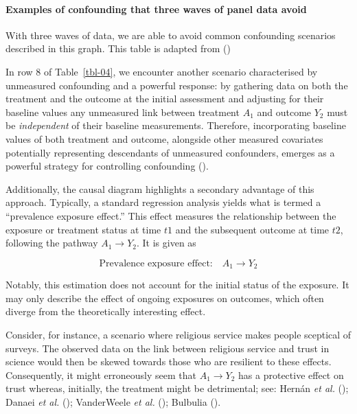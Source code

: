 \documentclass[
  singlecolumn]{article}
\let\oldparagraph\paragraph
\renewcommand{\paragraph}[1]{\oldparagraph{#1}\mbox{}}
\begin{document}
\paragraph{Examples of confounding that three waves of panel data
avoid}\label{examples-of-confounding-that-three-waves-of-panel-data-avoid}

\begin{table}

\caption{\label{tbl-04}With three waves of data, we are able to avoid
common confounding scenarios described in this graph. This table is
adapted from ()}

\centering{

\terminologychronologicalhygeine

}

\end{table}%

In row 8 of Table~\ref{tbl-04}, we encounter another scenario
characterised by unmeasured confounding and a powerful response: by
gathering data on both the treatment and the outcome at the initial
assessment and adjusting for their baseline values any unmeasured link
between treatment \(A_1\) and outcome \(Y_2\) must be \emph{independent}
of their baseline measurements. Therefore, incorporating baseline values
of both treatment and outcome, alongside other measured covariates
potentially representing descendants of unmeasured confounders, emerges
as a powerful strategy for controlling confounding
().

Additionally, the causal diagram highlights a secondary advantage of
this approach. Typically, a standard regression analysis yields what is
termed a ``prevalence exposure effect.'' This effect measures the
relationship between the exposure or treatment status at time \(t1\) and
the subsequent outcome at time \(t2\), following the pathway
\(A_{1} \to Y_{2}\). It is given as

\[
\text{Prevalence exposure effect:} \quad A_{1} \to Y_{2}
\]

Notably, this estimation does not account for the initial status of the
exposure. It may only describe the effect of ongoing exposures on
outcomes, which often diverge from the theoretically interesting effect.

Consider, for instance, a scenario where religious service makes people
sceptical of surveys. The observed data on the link between religious
service and trust in science would then be skewed towards those who are
resilient to these effects. Consequently, it might erroneously seem that
\(A_{1} \to Y_{2}\) has a protective effect on trust whereas, initially,
the treatment might be detrimental; see: Hernán \emph{et al.}
(); Danaei \emph{et al.}
(); VanderWeele \emph{et al.}
(); Bulbulia
().
\end{document}
